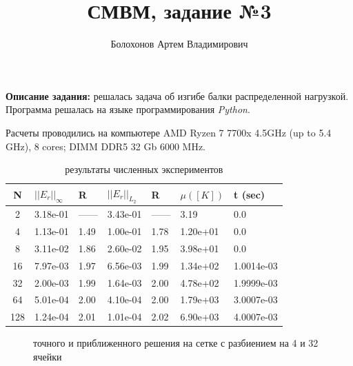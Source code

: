 \documentclass{article}
\title{СМВМ, задание №3}
\author{Болохонов Артем Владимирович}
\begin{document}
\date{}
\maketitle

\textbf{Описание задания:} решалась задача об изгибе балки распределенной нагрузкой. Программа решалась на языке программирования \textit{Python}.


Расчеты проводились на компьютере AMD Ryzen 7 7700x 4.5GHz (up to 5.4 GHz), 8 cores; DIMM DDR5 32 Gb 6000 MHz.


\begin{table}[H]
\centering
\begin{tabular}{|c|l|l|l|l|l|l|}
\hline
N   & $||E_r||_\infty$ & R        & $||E_r||_{L_2}$ & R        & $\mu([K])$ & t (sec) \\ \hline
2   & 3.18e-01       & ------        & 3.43e-01      & ------        & 3.19 & 0.0       \\ \hline
4   & 1.13e-01       & 1.49 & 1.00e-01      & 1.78 & 1.20e+01 & 0.0       \\ \hline
8   & 3.11e-02       & 1.86 & 2.60e-02      & 1.95 & 3.98e+01 & 0.0       \\ \hline
16  & 7.97e-03       & 1.97 & 6.56e-03      & 1.99 & 1.34e+02 & 1.0014e-03       \\ \hline
32  & 2.00e-03       & 1.99 & 1.64e-03      & 2.00 & 4.78e+02 & 1.9999e-03       \\ \hline
64  & 5.01e-04       & 2.00 & 4.10e-04      & 2.00 & 1.79e+03 & 3.0007e-03       \\ \hline
128 & 1.24e-04       & 2.01 & 1.01e-04      & 2.02 & 6.90e+03 & 4.0007e-03       \\ \hline
\end{tabular}
\caption{результаты численных экспериментов}
\end{table}


\begin{figure}[H]
  \centering
  \hfill
  \caption{ точного и приближенного решения на сетке с разбиением на 4 и 32 ячейки}
\end{figure}
\end{document}
